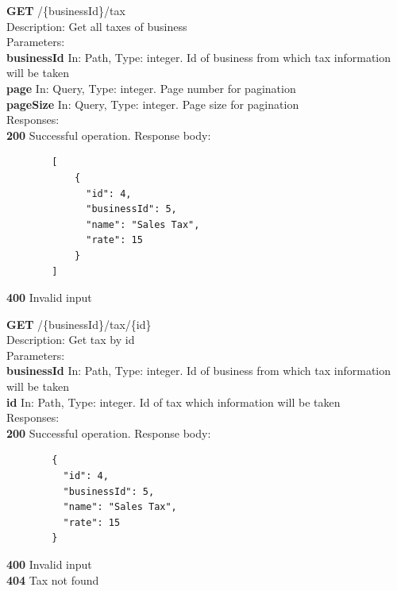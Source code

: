 \documentclass[11pt,a4paper,pdftex]{article}
\begin{document}
\hspace*{1em}\textbf{GET} /\{businessId\}/tax\\
\hspace*{2em}Description: Get all taxes of business\\
\hspace*{2em}Parameters:\\
\hspace*{3em}\textbf{businessId} In: Path, Type: integer. Id of business from which tax information will be taken\\
\hspace*{3em}\textbf{page} In: Query, Type: integer. Page number for pagination\\
\hspace*{3em}\textbf{pageSize} In: Query, Type: integer. Page size for pagination\\
\hspace*{2em}Responses:\\
\hspace*{3em}\textbf{200} Successful operation. Response body:
\begin{verbatim}
        [
            {
              "id": 4,
              "businessId": 5,
              "name": "Sales Tax",
              "rate": 15
            }
        ]
\end{verbatim}
\hspace*{3em}\textbf{400} Invalid input

\hspace*{1em}\textbf{GET} /\{businessId\}/tax/\{id\}\\
\hspace*{2em}Description: Get tax by id\\
\hspace*{2em}Parameters:\\
\hspace*{3em}\textbf{businessId} In: Path, Type: integer. Id of business from which tax information will be taken\\
\hspace*{3em}\textbf{id} In: Path, Type: integer. Id of tax which information will be taken\\
\hspace*{2em}Responses:\\
\hspace*{3em}\textbf{200} Successful operation. Response body:
\begin{verbatim}
        {
          "id": 4,
          "businessId": 5,
          "name": "Sales Tax",
          "rate": 15
        }
\end{verbatim}
\hspace*{3em}\textbf{400} Invalid input\\
\hspace*{3em}\textbf{404} Tax not found
\end{document}
